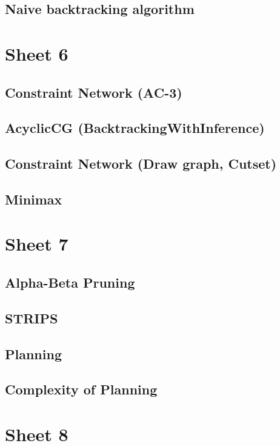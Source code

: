\documentclass{article}
\begin{document}
    \subsection{Naive backtracking algorithm}
    

\section{Sheet 6}
    \subsection{Constraint Network (AC-3)}
    \subsection{AcyclicCG (BacktrackingWithInference)}
    \subsection{Constraint Network (Draw graph, Cutset)}
    \subsection{Minimax}
    

\section{Sheet 7}
    \subsection{Alpha-Beta Pruning}
    \subsection{STRIPS}
    \subsection{Planning}
    \subsection{Complexity of Planning}
    

\section{Sheet 8}
\end{document}
